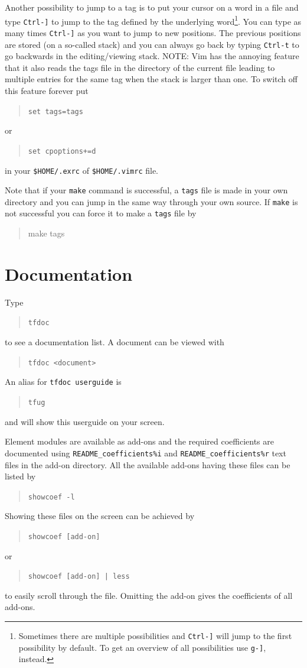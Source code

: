 Another possibility to jump to a tag is to
put your cursor on a word in a file and type
\texttt{Ctrl-]} to jump to the tag defined by the underlying word\footnote{Sometimes there are multiple possibilities and \texttt{Ctrl-]} will jump to the first possibility by default. To get an overview of all possibilities use \texttt{g-]}, instead.}.
You can type as many times \texttt{Ctrl-]} as you want to jump to new
positions. The previous positions are stored (on a so-called stack) and
you can always go back by typing \texttt{Ctrl-t} to go
backwards in the editing/viewing stack. NOTE: Vim has the annoying feature that 
it also reads the tags file in the directory of the current file leading to
multiple entries for the same tag when the stack is larger than one. To switch
off this feature forever put 
\begin{quote}
   \texttt{set tags=tags}
\end{quote}
or
\begin{quote}
   \texttt{set cpoptions+=d}
\end{quote}
in your \texttt{\$HOME/.exrc} of \texttt{\$HOME/.vimrc} file.

Note that if your \texttt{make} command is successful, a \texttt{tags} file is
made in your own directory and you can jump in the same way through your own
source. If \texttt{make} is not successful you can force it to make a
\texttt{tags} file by
\begin{quote}
   make tags
\end{quote}

\section{Documentation}

Type
\begin{quote}
   \texttt{tfdoc}
\end{quote}
to see a documentation list. A document can be viewed with
\begin{quote}
   \texttt{tfdoc <document>}
\end{quote}
An alias for \texttt{tfdoc userguide} is
\begin{quote}
   \texttt{tfug}
\end{quote}
and will show this userguide on your screen.

Element modules are available as add-ons and the required coefficients are
documented using \texttt{README\_coefficients\%i} and 
                 \texttt{README\_coefficients\%r} text files in the add-on
directory. 
All the available add-ons having these files can be listed by
\begin{quote}
   \texttt{showcoef -l}
\end{quote}
Showing these files on the screen can be achieved by
\begin{quote}
   \texttt{showcoef [add-on]}
\end{quote}
or 
\begin{quote}
   \texttt{showcoef [add-on] | less}
\end{quote}
to easily scroll through the file.
Omitting the add-on gives the coefficients of all add-ons.

